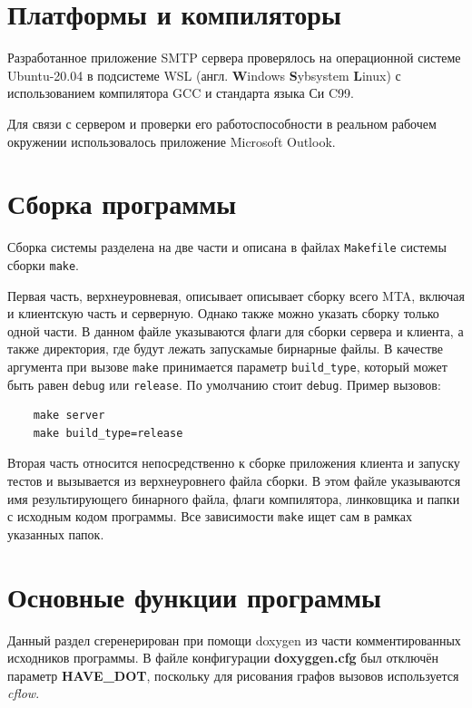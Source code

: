 \documentclass[a4paper,12pt]{report}
\begin{document}
\section{Платформы и компиляторы}

Разработанное приложение SMTP сервера проверялось на операционной системе Ubuntu-20.04 в подсистеме WSL (англ. \textbf{W}indows \textbf{S}ybsystem \textbf{L}inux) с использованием компилятора GCC и стандарта языка Си C99.

Для связи с сервером и проверки его работоспособности в реальном рабочем окружении использовалось приложение Microsoft Outlook.


\section{Сборка программы}

Сборка системы разделена на две части и описана в файлах \texttt{Makefile} системы сборки \texttt{make}.

Первая часть, верхнеуровневая, описывает описывает сборку всего MTA, включая и клиентскую часть и серверную. Однако также можно указать сборку только одной части. В данном файле указываются флаги для сборки сервера и клиента, а также директория, где будут лежать запускамые бирнарные файлы. В качестве аргумента при вызове \texttt{make} принимается параметр \texttt{build\_type}, который может быть равен \texttt{debug} или \texttt{release}. По умолчанию стоит \texttt{debug}. Пример вызовов:
\begin{verbatim}
    make server
    make build_type=release
\end{verbatim}

Вторая часть относится непосредственно к сборке приложения клиента и запуску тестов и вызывается из верхнеуровнего файла сборки. В этом файле указываются имя результирующего бинарного файла, флаги компилятора, линковщика и папки с исходным кодом программы. Все зависимости \texttt{make} ищет сам в рамках указанных папок.


\section{Основные функции программы}

Данный раздел сгеренерирован при помощи doxygen из части комментированных исходников программы. В файле конфигурации \textbf{doxyggen.cfg} был отключён параметр \textbf{HAVE\_DOT}, поскольку для рисования графов вызовов используется \textit{cflow}.
\end{document}
